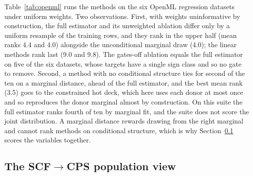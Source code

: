 Table~\ref{tab:openml} runs the methods on the six OpenML regression
datasets under uniform weights. Two observations. First, with weights
uninformative by construction, the full estimator and its unweighted ablation
differ only by a uniform resample of the training rows, and they rank in the
upper half (mean ranks 4.4 and 4.0) alongside the unconditional marginal draw
(4.0); the linear methods rank last (9.0 and 9.8). The gates-off ablation
equals the full estimator on five of the six datasets, whose targets have a
single sign class and so no gate to remove. Second, a method with no
conditional structure ties for second of the ten on a marginal
distance, ahead of the full estimator, and the best mean rank (3.5) goes to
the constrained hot deck, which here uses each donor at most once and so
reproduces the donor marginal almost by construction. On this suite the
full estimator ranks fourth of ten by marginal fit, and the suite does not
score the joint distribution. A marginal distance
rewards drawing from the right marginal and cannot rank methods on
conditional structure, which is why Section~\ref{sec:results-harness}
scores the variables together.

\subsection{The SCF\texorpdfstring{$\to$}{->}CPS population view}
\label{sec:results-harness}


